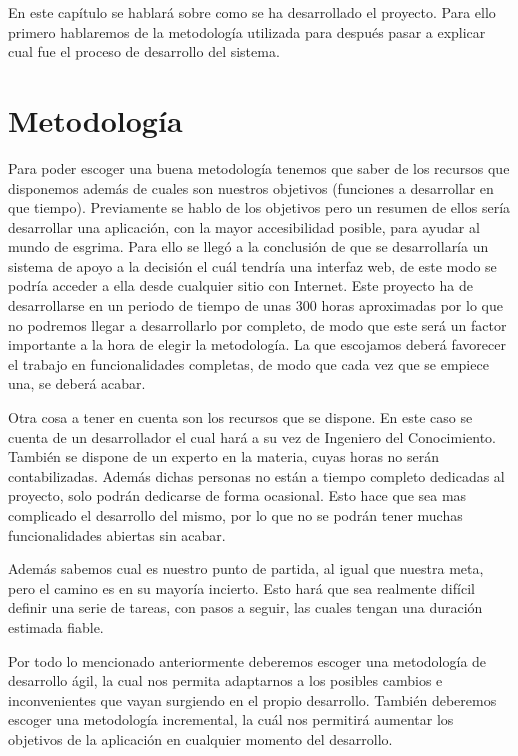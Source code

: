En este capítulo se hablará sobre como se ha desarrollado el proyecto. Para ello primero hablaremos
de la metodología utilizada para después pasar a explicar cual fue el proceso de desarrollo del sistema.

\section{Metodología}

Para poder escoger una buena metodología tenemos que saber de los recursos que disponemos además
de cuales son nuestros objetivos (funciones a desarrollar en que tiempo). Previamente se hablo
de los objetivos pero un resumen de ellos sería desarrollar una aplicación, con la mayor
accesibilidad posible, para ayudar al mundo de esgrima. Para ello se llegó a la conclusión de que
se desarrollaría un sistema de apoyo a la decisión el cuál tendría una interfaz web, de este modo
se podría acceder a ella desde cualquier sitio con Internet. Este proyecto ha de desarrollarse
en un periodo de tiempo de unas 300 horas aproximadas por lo que no podremos llegar a
desarrollarlo por completo, de modo que este será un factor importante a la hora de elegir la metodología.
La que escojamos deberá favorecer el trabajo en funcionalidades completas, de modo que cada vez
que se empiece una, se deberá acabar.

Otra cosa a tener en cuenta son los recursos que se dispone. En este caso se cuenta de
un desarrollador el cual hará a su vez de Ingeniero del Conocimiento. También se dispone de un
experto en la materia, cuyas horas no serán contabilizadas. Además dichas personas no están a tiempo
completo dedicadas al proyecto, solo podrán dedicarse de forma ocasional. Esto hace que sea
mas complicado el desarrollo del mismo, por lo que no se podrán tener muchas funcionalidades abiertas
sin acabar.

Además sabemos cual es nuestro punto de partida, al igual que nuestra meta, pero el camino es
en su mayoría incierto. Esto hará que sea realmente difícil definir una serie de tareas, con
pasos a seguir, las cuales tengan una duración estimada fiable.

Por todo lo mencionado anteriormente deberemos escoger una metodología de desarrollo ágil, la cual
nos permita adaptarnos a los posibles cambios e inconvenientes que vayan surgiendo en el propio
desarrollo. También deberemos escoger una metodología incremental, la cuál nos permitirá aumentar
los objetivos de la aplicación en cualquier momento del desarrollo.
